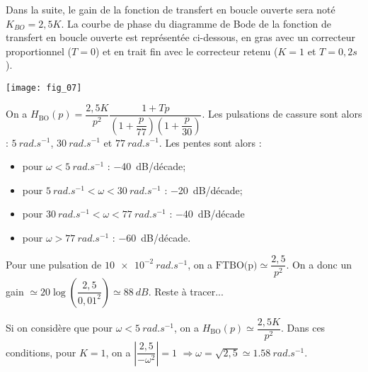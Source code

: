 \begin{multicols}{2}
\ifprof
\else
Dans la suite, le gain de la fonction de transfert en boucle ouverte sera noté $K_{BO}=2,5 K$.
La courbe de phase du diagramme de Bode de la fonction de transfert en boucle ouverte est représentée ci-dessous, en gras avec un correcteur proportionnel ($T=0$) et en trait fin avec le correcteur retenu ($K=1$ et $T=0,2s$).


\begin{center}
\texttt{[image: fig\_07]}
\end{center}
\fi



\ifprof
\begin{corrige}
On a  $H_{\text{BO}}(p)=\dfrac{2,5 K}{p^2}\dfrac{1+Tp}{\left( 1+\dfrac{p}{77}\right)\left(1+\dfrac{p}{30} \right)}$. 
Les pulsations de cassure sont alors :  $\SI{5}{rad.s^{-1}}$, $\SI{30}{rad.s^{-1}}$ et $\SI{77}{rad.s^{-1}}$.
Les pentes sont alors : 
\begin{itemize}
\item pour $\omega<\SI{5}{rad.s^{-1}}$ : \SI{-40}{dB}/décade;
\item pour $\SI{5}{rad.s^{-1}}<\omega<\SI{30}{rad.s^{-1}}$ : \SI{-20}{dB}/décade;
\item pour $\SI{30}{rad.s^{-1}}<\omega<\SI{77}{rad.s^{-1}}$ : \SI{-40}{dB}/décade
\item pour $\omega>\SI{77}{rad.s^{-1}}$ : \SI{-60}{dB}/décade.
\end{itemize}
Pour une pulsation de $\SI{10e-2}{rad.s^{-1}}$, on a $\text{FTBO(p)}\simeq \dfrac{2,5}{p^2}$. On a donc un gain $\simeq 20\log\left(\dfrac{2,5}{0,01^2}\right) \simeq \SI{88}{dB} $.
Reste à tracer...
\end{corrige}

\fi

\ifprof
\begin{corrige}
Si on considère que pour $\omega<\SI{5}{rad.s^{-1}}$, on a   $H_{\text{BO}}(p)\simeq \dfrac{2,5 K}{p^2}$. Dans ces conditions, pour $K=1$, on a 
$\left|\dfrac{2,5 }{-\omega^2}\right|=1$ 
$\Rightarrow \omega= \sqrt{2,5}\simeq \SI{1,58}{rad.s^{-1}} $.


\end{corrige}
\end{multicols}
